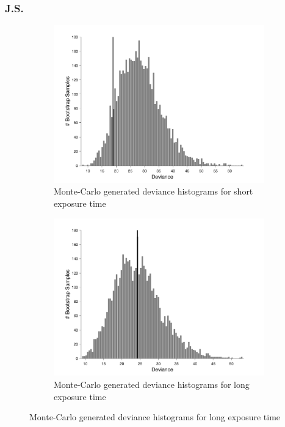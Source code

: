 \documentclass{article}
\begin{document}
\subsubsection*{J.S.}
\begin{figure}[!hb]
    \begin{subfigure}{0.494\textwidth}
        \centering
        \includegraphics[width = \linewidth]{Thesis/plots/gof/segSize/segSize_js_short_bootstrap.png}
        \caption{Monte-Carlo generated deviance histograms for short exposure time}
        \label{fig:da_gof_short_bootstrap}
    \end{subfigure}
    \hspace{0.01\textwidth}
    \begin{subfigure}{0.494\textwidth}
        \centering
        \includegraphics[width = \linewidth]{Thesis/plots/gof/segSize/segSize_js_long_bootstrap.png}
        \caption{Monte-Carlo generated deviance histograms for long exposure time}
        \label{fig:da_gof_long_bootstrap}
    \end{subfigure}
    

\end{figure}
\end{document}
